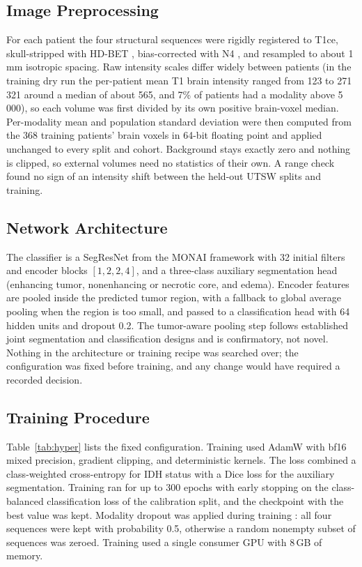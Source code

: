 \documentclass[journal]{IEEEtran}
\begin{document}
\subsection{Image Preprocessing}
For each patient the four structural sequences were rigidly registered to T1ce, skull-stripped with HD-BET \cite{isensee2019hdbet}, bias-corrected with N4 \cite{tustison2010n4}, and resampled to about 1\,mm isotropic spacing. Raw intensity scales differ widely between patients (in the training dry run the per-patient mean T1 brain intensity ranged from 123 to 271\,321 around a median of about 565, and 7\% of patients had a modality above 5\,000), so each volume was first divided by its own positive brain-voxel median. Per-modality mean and population standard deviation were then computed from the 368 training patients' brain voxels in 64-bit floating point and applied unchanged to every split and cohort. Background stays exactly zero and nothing is clipped, so external volumes need no statistics of their own. A range check found no sign of an intensity shift between the held-out UTSW splits and training.

\subsection{Network Architecture}
The classifier is a SegResNet \cite{myronenko2019segresnet} from the MONAI framework \cite{cardoso2022monai} with 32 initial filters and encoder blocks $[1,2,2,4]$, and a three-class auxiliary segmentation head (enhancing tumor, nonenhancing or necrotic core, and edema). Encoder features are pooled inside the predicted tumor region, with a fallback to global average pooling when the region is too small, and passed to a classification head with 64 hidden units and dropout 0.2. The tumor-aware pooling step follows established joint segmentation and classification designs \cite{vandervoort2023} and is confirmatory, not novel. Nothing in the architecture or training recipe was searched over; the configuration was fixed before training, and any change would have required a recorded decision.

\subsection{Training Procedure}
Table~\ref{tab:hyper} lists the fixed configuration. Training used AdamW \cite{loshchilov2019adamw} with bf16 mixed precision, gradient clipping, and deterministic kernels. The loss combined a class-weighted cross-entropy for IDH status with a Dice loss for the auxiliary segmentation. Training ran for up to 300 epochs with early stopping on the class-balanced classification loss of the calibration split, and the checkpoint with the best value was kept. Modality dropout was applied during training \cite{neverova2016}: all four sequences were kept with probability 0.5, otherwise a random nonempty subset of sequences was zeroed. Training used a single consumer GPU with 8\,GB of memory.
\end{document}
